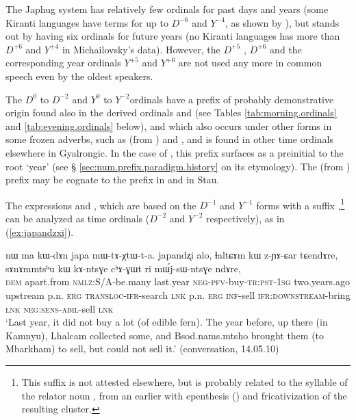 The Japhug system has relatively few ordinals for past days and years (some Kiranti languages have terms for up to $D^{-6}$ and $Y^{-4}$, as shown by \citealt{michailovsky03ordinals}), but stands out by having six ordinals for future years (no Kiranti languages has more than $D^{+6}$ and $Y^{+4}$ in Michailovsky's \citeyear{michailovsky03ordinals} data). However, the $D^{+5}$ , $D^{+6}$   and the corresponding year ordinals  $Y^{+5}$  and  $Y^{+6}$  are not used any more in common speech even by the oldest speakers.
 

The $D^{0}$ to $D^{-2}$ and $Y^{0}$ to $Y^{-2}$ordinals have a prefix of probably demonstrative origin  found also in the derived ordinals  and  (see Tables \ref{tab:morning.ordinals} and \ref{tab:evening.ordinals} below), and which also occurs under other forms in some frozen adverbs, such as  (from ) and , and is found in other time ordinals elsewhere in Gyalrongic. In the case of , this prefix surfaces as a preinitial   to the root  `year' (see § \ref{sec:num.prefix.paradigm.history} on its etymology). The  (from ) prefix may be cognate to the prefix  in  and  in Stau.

 The expressions   and , which are based on the $D^{-1}$ and $Y^{-1}$ forms with a suffix ,\footnote{This suffix  is not attested elsewhere, but is probably related to the syllable  of the relator noun , from an earlier  with epenthesis () and fricativization of the resulting  cluster. } can be analyzed as time ordinals ($D^{-2}$ and $Y^{-2}$ respectively), as in (\ref{ex:japandzxi}).
 
\begin{exe}
\ex \label{ex:japandzxi}
\gll   nɯ ma kɯ-dɤn japa mɯ-tɤ-χtɯ-t-a. japandʐi alo, ɬaltɕɤm kɯ z-ɲɤ-ɕar tɕendɤre, sɤnɤmmtsʰu kɯ kɤ-ntsɣe cʰɤ-ɣɯt ri mɯ́j-sɯ-ntsɣe ndɤre, \\
 \textsc{dem} apart.from \textsc{nmlz}:S/A-be.many last.year \textsc{neg}-\textsc{pfv}-buy-\textsc{tr}:\textsc{pst}-\textsc{1sg}  two.years.ago upstream p.n. \textsc{erg} \textsc{transloc}-\textsc{ifr}-search \textsc{lnk} p.n. \textsc{erg} \textsc{inf}-sell \textsc{ifr}:\textsc{downstream}-bring \textsc{lnk} \textsc{neg}:\textsc{sens}-\textsc{abil}-sell \textsc{lnk} \\
\glt `Last year, it did not buy a lot (of edible fern). The year before, up there (in Kamnyu), Lhalcam collected some, and Bsod.nams.mtsho brought them (to Mbarkham) to sell, but could not sell it.' (conversation, 14.05.10)
\end{exe}

